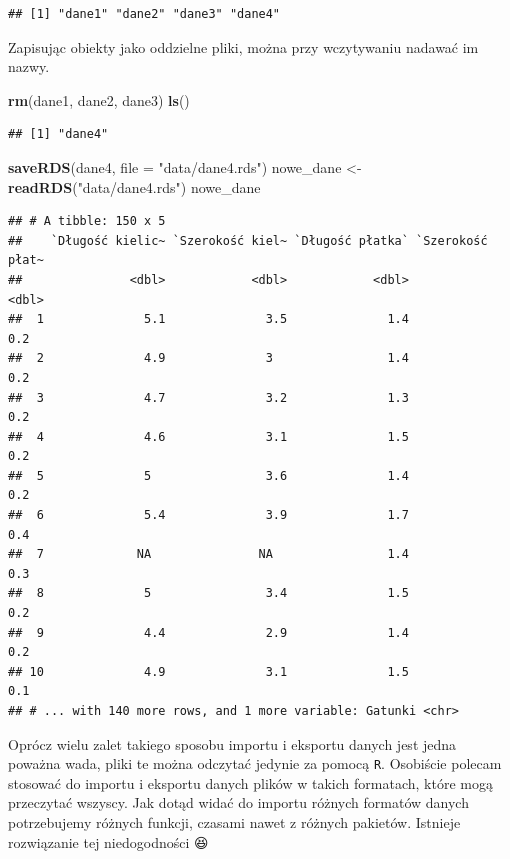 \documentclass[]{book}
\newenvironment{Shaded}{\begin{snugshade}}{\end{snugshade}}
\newcommand{\DataTypeTok}[1]{\textcolor[rgb]{0.13,0.29,0.53}{#1}}
\newcommand{\KeywordTok}[1]{\textcolor[rgb]{0.13,0.29,0.53}{\textbf{#1}}}
\newcommand{\NormalTok}[1]{#1}
\newcommand{\StringTok}[1]{\textcolor[rgb]{0.31,0.60,0.02}{#1}}
\theoremstyle{plain}
\theoremstyle{definition}
\theoremstyle{definition}
\theoremstyle{definition}
\theoremstyle{definition}
\theoremstyle{remark}
\begin{document}
\begin{verbatim}
## [1] "dane1" "dane2" "dane3" "dane4"
\end{verbatim}

Zapisując obiekty jako oddzielne pliki, można przy wczytywaniu nadawać im nazwy.

\begin{Shaded}
\begin{Highlighting}[]
\KeywordTok{rm}\NormalTok{(dane1, dane2, dane3)}
\KeywordTok{ls}\NormalTok{()}
\end{Highlighting}
\end{Shaded}

\begin{verbatim}
## [1] "dane4"
\end{verbatim}

\begin{Shaded}
\begin{Highlighting}[]
\KeywordTok{saveRDS}\NormalTok{(dane4, }\DataTypeTok{file =} \StringTok{"data/dane4.rds"}\NormalTok{)}
\NormalTok{nowe_dane <-}\StringTok{ }\KeywordTok{readRDS}\NormalTok{(}\StringTok{"data/dane4.rds"}\NormalTok{)}
\NormalTok{nowe_dane}
\end{Highlighting}
\end{Shaded}

\begin{verbatim}
## # A tibble: 150 x 5
##    `Długość kielic~ `Szerokość kiel~ `Długość płatka` `Szerokość płat~
##               <dbl>            <dbl>            <dbl>            <dbl>
##  1              5.1              3.5              1.4              0.2
##  2              4.9              3                1.4              0.2
##  3              4.7              3.2              1.3              0.2
##  4              4.6              3.1              1.5              0.2
##  5              5                3.6              1.4              0.2
##  6              5.4              3.9              1.7              0.4
##  7             NA               NA                1.4              0.3
##  8              5                3.4              1.5              0.2
##  9              4.4              2.9              1.4              0.2
## 10              4.9              3.1              1.5              0.1
## # ... with 140 more rows, and 1 more variable: Gatunki <chr>
\end{verbatim}

Oprócz wielu zalet takiego sposobu importu i eksportu danych jest jedna poważna wada, pliki te można odczytać jedynie za pomocą \texttt{R}. Osobiście polecam stosować do importu i eksportu danych plików w takich formatach, które mogą przeczytać wszyscy. Jak dotąd widać do importu różnych formatów danych potrzebujemy różnych funkcji, czasami nawet z różnych pakietów. Istnieje rozwiązanie tej niedogodności 😆
\end{document}
